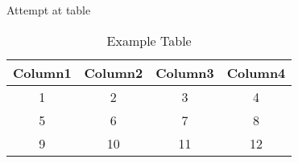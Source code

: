 Attempt at table

\begin{table}[ht]
    \centering
    \begin{tabular}{cccc}
    \toprule
    \textbf{Column1} & \textbf{Column2} & \textbf{Column3} & \textbf{Column4} \\
    \midrule
    1 & 2 & 3 & 4 \\
    5 & 6 & 7 & 8 \\
    9 & 10 & 11 & 12 \\
    \bottomrule
    \end{tabular}
    \caption{Example Table}
    \label{tab:example}
\end{table}
    